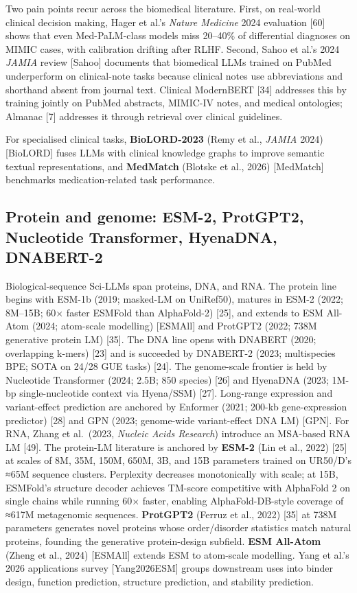 Two pain points recur across the biomedical literature. First, on real-world clinical decision making, Hager et al.'s \emph{Nature Medicine} 2024 evaluation {[}60{]} shows that even Med-PaLM-class models miss 20--40\% of differential diagnoses on MIMIC cases, with calibration drifting after RLHF. Second, Sahoo et al.'s 2024 \emph{JAMIA} review {[}Sahoo{]} documents that biomedical LLMs trained on PubMed underperform on clinical-note tasks because clinical notes use abbreviations and shorthand absent from journal text. Clinical ModernBERT {[}34{]} addresses this by training jointly on PubMed abstracts, MIMIC-IV notes, and medical ontologies; Almanac {[}7{]} addresses it through retrieval over clinical guidelines.

For specialised clinical tasks, \textbf{BioLORD-2023} (Remy et al., \emph{JAMIA} 2024) {[}BioLORD{]} fuses LLMs with clinical knowledge graphs to improve semantic textual representations, and \textbf{MedMatch} (Blotske et al., 2026) {[}MedMatch{]} benchmarks medication-related task performance.

\subsection{Protein and genome: ESM-2, ProtGPT2, Nucleotide Transformer, HyenaDNA, DNABERT-2}\label{protein-and-genome-esm-2-protgpt2-nucleotide-transformer-hyenadna-dnabert-2}

Biological-sequence Sci-LLMs span proteins, DNA, and RNA. The protein line begins with ESM-1b (2019; masked-LM on UniRef50), matures in ESM-2 (2022; 8M--15B; 60× faster ESMFold than AlphaFold-2) {[}25{]}, and extends to ESM All-Atom (2024; atom-scale modelling) {[}ESMAll{]} and ProtGPT2 (2022; 738M generative protein LM) {[}35{]}. The DNA line opens with DNABERT (2020; overlapping k-mers) {[}23{]} and is succeeded by DNABERT-2 (2023; multispecies BPE; SOTA on 24/28 GUE tasks) {[}24{]}. The genome-scale frontier is held by Nucleotide Transformer (2024; 2.5B; 850 species) {[}26{]} and HyenaDNA (2023; 1M-bp single-nucleotide context via Hyena/SSM) {[}27{]}. Long-range expression and variant-effect prediction are anchored by Enformer (2021; 200-kb gene-expression predictor) {[}28{]} and GPN (2023; genome-wide variant-effect DNA LM) {[}GPN{]}. For RNA, Zhang et al.~(2023, \emph{Nucleic Acids Research}) introduce an MSA-based RNA LM {[}49{]}. The protein-LM literature is anchored by \textbf{ESM-2} (Lin et al., 2022) {[}25{]} at scales of 8M, 35M, 150M, 650M, 3B, and 15B parameters trained on UR50/D's ≈65M sequence clusters. Perplexity decreases monotonically with scale; at 15B, ESMFold's structure decoder achieves TM-score competitive with AlphaFold 2 on single chains while running 60× faster, enabling AlphaFold-DB-style coverage of ≈617M metagenomic sequences. \textbf{ProtGPT2} (Ferruz et al., 2022) {[}35{]} at 738M parameters generates novel proteins whose order/disorder statistics match natural proteins, founding the generative protein-design subfield. \textbf{ESM All-Atom} (Zheng et al., 2024) {[}ESMAll{]} extends ESM to atom-scale modelling. Yang et al.'s 2026 applications survey {[}Yang2026ESM{]} groups downstream uses into binder design, function prediction, structure prediction, and stability prediction.

